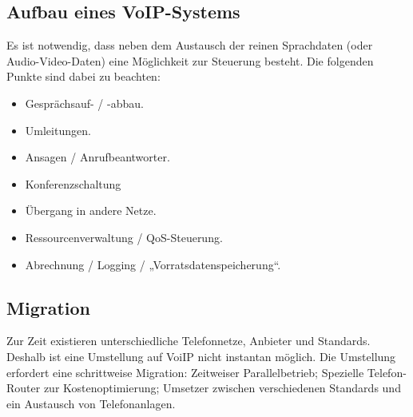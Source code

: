 \documentclass{article} %
\begin{document}
\subsection{Aufbau eines VoIP-Systems}
Es ist notwendig, dass neben dem Austausch der reinen Sprachdaten (oder Audio-Video-Daten) eine Möglichkeit zur Steuerung besteht. Die folgenden Punkte sind dabei zu beachten:
\begin{itemize}
	\item Gesprächsauf- / -abbau.
	\item Umleitungen.
	\item Ansagen / Anrufbeantworter.
	\item Konferenzschaltung
	\item Übergang in andere Netze.
	\item Ressourcenverwaltung / QoS-Steuerung.
	\item Abrechnung / Logging / „Vorratsdatenspeicherung“.
\end{itemize}

\subsection{Migration}
Zur Zeit existieren unterschiedliche Telefonnetze, Anbieter und Standards. Deshalb ist eine Umstellung auf VoiIP nicht instantan möglich. Die Umstellung erfordert eine schrittweise Migration: Zeitweiser Parallelbetrieb; Spezielle Telefon-Router zur Kostenoptimierung; Umsetzer zwischen verschiedenen Standards und ein Austausch von Telefonanlagen.
\end{document}
